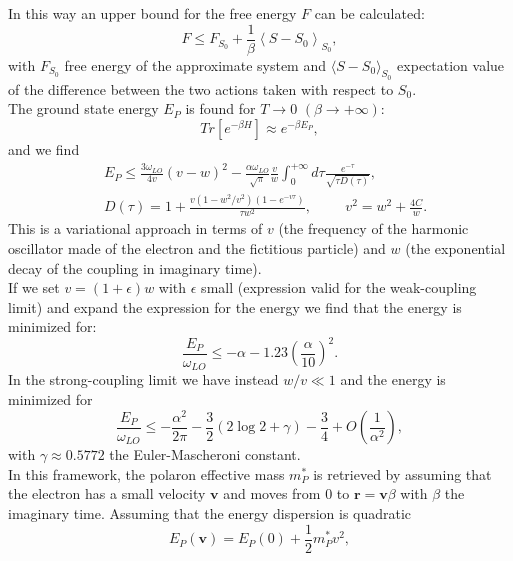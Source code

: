 In this way an upper bound for the free energy $F$ can be calculated:
\begin{equation}
    F\le F_{S_0}+\frac{1}{\beta}\left \langle S-S_0 \right\rangle_{S_0},
\end{equation}
with $F_{S_0}$ free energy of the approximate system and $\langle S-S_0\rangle_{S_0}$ expectation value of the difference between the two actions taken with respect to 
$S_0$.\\
The ground state energy $E_P$ is found for $T\to0$ $(\beta\to+\infty)$:
\begin{equation}
    Tr\left[e^{-\beta H}\right]\approx e^{-\beta E_P},
\end{equation}
and we find
\begin{equation}
\begin{split}
    &E_P\le \frac{3\omega_{LO}}{4v}(v-w)^2-\frac{\alpha\omega_{LO}}{\sqrt{\pi}}\frac{v}{w}\int_0^{+\infty}d\tau\frac{e^{-\tau}}{\sqrt{\tau D(\tau)}},\\
    &D(\tau)=1+\frac{v(1-w^2/v^2)(1-e^{-v\tau})}{\tau w^2},\hspace{1cm}v^2=w^2+\frac{4C}{w}.
\end{split}
\end{equation}
This is a variational approach in terms of $v$ (the frequency of the harmonic oscillator made of the electron and the fictitious particle) and 
$w$ (the exponential decay of the coupling in imaginary time).\\
If we set $v=(1+\epsilon)w$ with $\epsilon$ small (expression valid for the weak-coupling limit) and expand the expression for the energy we find that the energy 
is minimized for:
\begin{equation}
    \frac{E_P}{\omega_{LO}}\le -\alpha-1.23\left(\frac{\alpha}{10}\right)^2.
\end{equation}
In the strong-coupling limit we have instead $w/v\ll1$ and the energy is minimized for 
\begin{equation}
    \frac{E_P}{\omega_{LO}}\le -\frac{\alpha^2}{2\pi}-\frac{3}{2}(2\log2+\gamma)-\frac{3}{4}+O(\frac{1}{\alpha^2}),
\end{equation}
with $\gamma\approx 0.5772$ the Euler-Mascheroni constant.\\
In this framework, the polaron effective mass $m^*_P$ is retrieved by assuming that the electron has a small velocity $\mathbf{v}$ and moves from 
$0$ to $\mathbf{r}=\mathbf{v}\beta$ with $\beta$ the imaginary time. Assuming that the energy dispersion is quadratic
\begin{equation}
    E_P(\mathbf{v})=E_P(0)+\frac{1}{2}m^*_Pv^2,
\end{equation}
